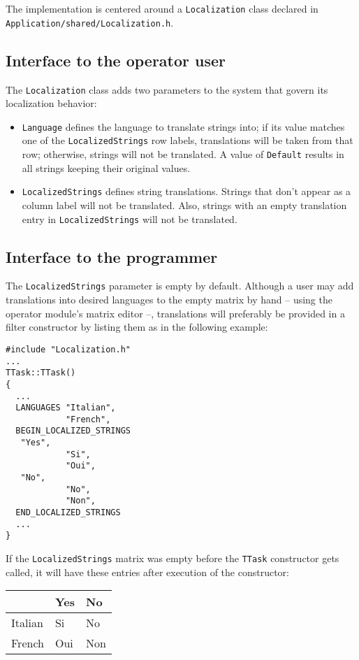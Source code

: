\documentclass[12pt,a4paper]{article}
\begin{document}
The implementation is centered around a \texttt{Localization} class declared in \texttt{Application/shared/Localization.h}.

\subsection{Interface to the operator user}

The \texttt{Localization} class adds two parameters to the system that govern its localization
behavior: 
\begin{itemize}
\item
\texttt{Language} defines the language to translate strings
into; if its value matches one of the \texttt{LocalizedStrings} row
labels, translations will be taken from that row; otherwise,
strings will not be translated.
A value of \texttt{Default} results in all strings keeping their original values.
\item
\texttt{LocalizedStrings} defines string translations. Strings that
don't appear as a column label will not be translated.
Also, strings with an empty translation entry in \texttt{LocalizedStrings}
will not be translated.
\end{itemize}

\subsection{Interface to the programmer}

The \texttt{LocalizedStrings} parameter is empty by default.
Although a user may add translations into desired languages to the empty matrix by hand -- using the operator module's matrix editor --,
translations will preferably be provided in a filter constructor by listing them as in the following example:
\begin{verbatim}
#include "Localization.h"
...
TTask::TTask()
{
  ...
  LANGUAGES "Italian",
            "French",
  BEGIN_LOCALIZED_STRINGS
   "Yes",
            "Si",
            "Oui",
   "No",
            "No",
            "Non",
  END_LOCALIZED_STRINGS
  ...
}
\end{verbatim}

If the \texttt{LocalizedStrings} matrix was empty before the \texttt{TTask} constructor gets called, it will have these entries after execution of the constructor:

\begin{center}
\begin{tabular}[t]{l|ll}
          & Yes   & No  \\ \hline
  Italian & Si    & No  \\
  French  & Oui   & Non \\
\end{tabular}
\end{center}
\end{document}
